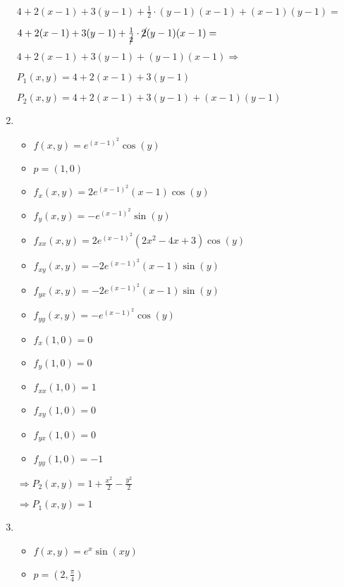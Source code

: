 \documentclass[../practica_05.tex]{subfiles}
\begin{document}
\begin{enumerate}
            $ 4 + 2(x-1) + 3(y-1) + \frac{1}{2} \cdot (y-1)(x-1) + (x-1)(y-1) = $

            $ 4 + 2(x-1) + 3(y-1) + \frac{1}{\cancel{2}} \cdot \cancel{2}(y-1)(x-1) = $

            $ 4 + 2(x-1) + 3(y-1) + (y-1)(x-1) \Rightarrow$

            $P_1(x,y) = 4 + 2(x-1) + 3(y-1)$

            $P_2(x,y) = 4 + 2(x-1) + 3(y-1) + (x-1)(y-1)$

        \item 
            \begin{itemize}
                \item $f(x,y) = e^{(x-1)^2}\cos(y)$
                \item $p = (1,0)$
            \end{itemize}

            \begin{itemize}
                \item $f_{x}(x,y) = 2e^{(x-1)^2}(x-1)\cos(y) $
                \item $f_{y}(x,y) = -e^{(x-1)^2}\sin(y) $
                \item $f_{xx}(x,y) = 2e^{(x-1)^2}(2x^2-4x+3)\cos(y) $
                \item $f_{xy}(x,y) = -2e^{(x-1)^2}(x-1)\sin(y) $
                \item $f_{yx}(x,y) = -2e^{(x-1)^2}(x-1)\sin(y) $
                \item $f_{yy}(x,y) = -e^{(x-1)^2}\cos(y) $
            \end{itemize}

            \begin{itemize}
                \item $f_{x}(1,0) = 0 $
                \item $f_{y}(1,0) = 0 $
                \item $f_{xx}(1,0) = 1 $
                \item $f_{xy}(1,0) = 0 $
                \item $f_{yx}(1,0) = 0 $
                \item $f_{yy}(1,0) = -1 $
            \end{itemize}

            $\Rightarrow P_2(x,y) = 1 + \frac{x^2}{2} - \frac{y^2}{2}$

            $\Rightarrow P_1(x,y) = 1 $


        \item 
            \begin{itemize}
                \item $f(x,y) = e^x\sin(xy)$
                \item $p = (2,\frac{\pi}{4})$
            \end{itemize}


\end{enumerate}
\end{document}
